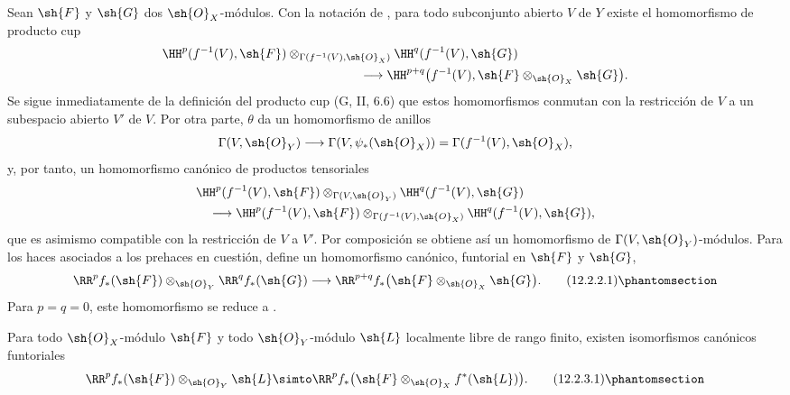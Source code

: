 \documentclass[oneside]{amsart}
\newcommand{\oldpage}[2][]{{\marginnote{\normalfont\textbf{#1}~|~#2}}\ignorespaces}
\let\EGAOriginalLabel\label
\renewcommand{\label}[1]{\phantomsection\EGAOriginalLabel{#1}}
\begin{document}
\begin{env}[12.2.2]
\label{0.12.2.2}
Sean $\sh{F}$ y $\sh{G}$ dos $\sh{O}_X$-módulos.
Con la notación de , para todo subconjunto abierto $V$ de
$Y$ existe el homomorfismo de producto cup 
\[
  \begin{aligned}
  &\HH^p(f^{-1}(V),\sh{F})
    \otimes_{\Gamma(f^{-1}(V),\sh{O}_X)}
    \HH^q(f^{-1}(V),\sh{G})\\
  &\hspace{55mm}\longrightarrow
    \HH^{p+q}\bigl(f^{-1}(V),
      \sh{F}\otimes_{\sh{O}_X}\sh{G}\bigr).
  \end{aligned}
\]
\oldpage[0\textsubscript{III}]{58}
Se sigue inmediatamente de la definición del producto cup
(G, II, 6.6) que estos homomorfismos conmutan con la restricción de
$V$ a un subespacio abierto $V'$ de $V$.
Por otra parte, $\theta$ da un homomorfismo de anillos
\[
  \Gamma(V,\sh{O}_Y)
  \longrightarrow\Gamma(V,\psi_*(\sh{O}_X))
  =\Gamma(f^{-1}(V),\sh{O}_X),
\]
y, por tanto, un homomorfismo canónico de productos tensoriales
\[
  \begin{aligned}
  &\HH^p(f^{-1}(V),\sh{F})
    \otimes_{\Gamma(V,\sh{O}_Y)}
    \HH^q(f^{-1}(V),\sh{G})\\
  &\quad\longrightarrow
    \HH^p(f^{-1}(V),\sh{F})
    \otimes_{\Gamma(f^{-1}(V),\sh{O}_X)}
    \HH^q(f^{-1}(V),\sh{G}),
  \end{aligned}
\]
que es asimismo compatible con la restricción de $V$ a $V'$.
Por composición se obtiene así un homomorfismo de
$\Gamma(V,\sh{O}_Y)$-módulos.  Para los haces asociados a los
prehaces en cuestión, define un homomorfismo canónico,
funtorial en $\sh{F}$ y $\sh{G}$,
\[
  \RR^p f_*(\sh{F})\otimes_{\sh{O}_Y}\RR^q f_*(\sh{G})
  \longrightarrow
  \RR^{p+q}f_*
    \bigl(\sh{F}\otimes_{\sh{O}_X}\sh{G}\bigr).
  \tag{12.2.2.1}
  \label{0.12.2.2.1}
\]
Para $p=q=0$, este homomorfismo se reduce a
.
\end{env}

\begin{proposition}[12.2.3]
\label{0.12.2.3}
Para todo $\sh{O}_X$-módulo $\sh{F}$ y todo $\sh{O}_Y$-módulo
$\sh{L}$ localmente libre de rango finito, existen isomorfismos canónicos
funtoriales
\[
  \RR^p f_*(\sh{F})\otimes_{\sh{O}_Y}\sh{L}
  \simto
  \RR^p f_*
    \bigl(\sh{F}\otimes_{\sh{O}_X}f^*(\sh{L})\bigr).
  \tag{12.2.3.1}
  \label{0.12.2.3.1}
\]
\end{proposition}
\end{document}
